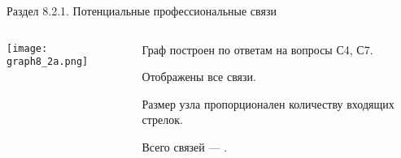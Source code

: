 \begin{frame}{Раздел 8.2.1. Потенциальные профессиональные связи}

\begin{columns}
\begin{column}{0.75\textwidth} 
\centering
          \texttt{[image: graph8\_2a.png]}
\end{column}
\begin{column}{0.25\textwidth} 

\tiny
Граф построен по ответам на вопросы С4, С7.
\smallskip

Отображены все связи. 
\smallskip

Размер узла пропорционален количеству входящих стрелок.
\bigskip

Всего связей --- \valHBAlinks.

\end{column}
\end{columns}
\end{frame}


